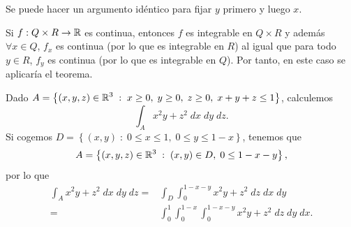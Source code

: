 \begin{observation}
Se puede hacer un argumento idéntico para fijar $\displaystyle y $ primero y luego $\displaystyle x $. 
\end{observation}
\begin{observation}
Si $\displaystyle f : Q \times R \to \mathbb{R} $ es continua, entonces $\displaystyle f $ es integrable en $\displaystyle Q \times R $ y además $\displaystyle \forall x \in Q $, $\displaystyle f_{x} $ es continua (por lo que es integrable en $\displaystyle R $) al igual que para todo $\displaystyle y \in R $, $\displaystyle f_{y} $ es continua (por lo que es integrable en $\displaystyle Q $). Por tanto, en este caso se aplicaría el teorema.
\end{observation}
\begin{eg}
	Dado $\displaystyle A = \left\{ \left(x,y,z\right)\in \mathbb{R}^{3} \; : \; x\geq 0, \; y \geq 0, \; z \geq 0, \; x +y+ z \leq 1\right\}  $, calculemos 
	\[\int _{A}x^{2}y+z^{2} \; dx \; dy \; dz .\]
	Si cogemos $\displaystyle D = \left\{ \left(x,y\right) \; : \; 0 \leq x \leq 1, \; 0 \leq y \leq 1- x\right\}  $, tenemos que 
	\[ A = \left\{ \left(x,y,z\right)\in \mathbb{R}^{3} \; : \; \left(x,y\right)\in D, \; 0 \leq 1 - x - y\right\},\]
	por lo que 
\[
\begin{split}
	\int _{A}x^{2}y+z^{2} \; dx \; dy \; dz= & \int_{D}\int^{1-x-y}_{0} x^{2}y+z^{2} \; dz \; dx \; dy \\
	= & \int^{1}_{0} \int^{1-x}_{0} \int^{1-x-y}_{0} x^{2}y+z^{2} \; dz \; dy \; dx.
\end{split}
\]	
\end{eg}
